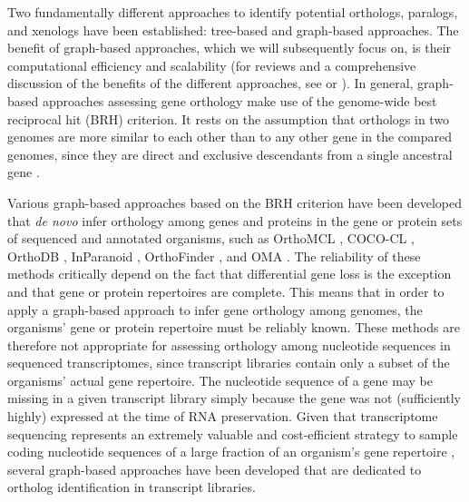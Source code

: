 Two fundamentally different approaches to identify potential orthologs,
paralogs, and xenologs have been established: tree-based and graph-based
approaches. The benefit of graph-based approaches, which we will
subsequently focus on, is their computational efficiency and scalability
(for reviews and a comprehensive discussion of the benefits of the
different approaches, see \cite{Dutilh2007} or \cite{Kristensen2011}).
In general, graph-based approaches assessing gene orthology make use of
the genome-wide best reciprocal hit (BRH) criterion. It rests on the
assumption that orthologs in two genomes are more similar to each other
than to any other gene in the compared genomes, since they are direct
and exclusive descendants from a single ancestral gene
\cite{Altenhoff2012}.

Various graph-based approaches based on the BRH criterion have been
developed that \emph{de novo} infer orthology among genes and proteins
in the gene or protein sets of sequenced and annotated organisms, such
as OrthoMCL \cite{Li2003}, COCO-CL \cite{Jothi2006}, OrthoDB
\cite{Kriventseva2015}, InParanoid \cite{Sonnhammer2015}, OrthoFinder
\cite{Emms2015}, and OMA \cite{Altenhoff2015}. The reliability of these
methods critically depend on the fact that differential gene loss is the
exception and that gene or protein repertoires are complete. This means
that in order to apply a graph-based approach to infer gene orthology
among genomes, the organisms' gene or protein repertoire must be
reliably known. These methods are therefore not appropriate for
assessing orthology among nucleotide sequences in sequenced
transcriptomes, since transcript libraries contain only a subset of the
organisms' actual gene repertoire. The nucleotide sequence of a gene may
be missing in a given transcript library simply because the gene was not
(sufficiently highly) expressed at the time of RNA preservation. Given
that transcriptome sequencing represents an extremely valuable and
cost-efficient strategy to sample coding nucleotide sequences of a large
fraction of an organism's gene repertoire \cite{Misof2014}, several
graph-based approaches have been developed that are dedicated to
ortholog identification in transcript libraries.

